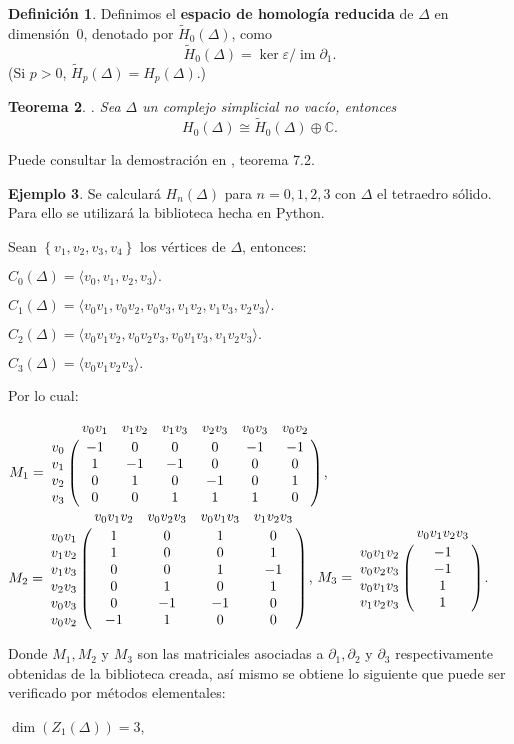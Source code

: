 \documentclass[12pt]{book}
\newtheorem{theorem}{Teorema}[section]
\theoremstyle{definition}
\newtheorem{definition}[theorem]{Definición}
\newtheorem{example}[theorem]{Ejemplo}
\newcounter{in}
\newcounter{ini}
\DeclareMathOperator{\im}{im}
\begin{document}
\begin{definition}
  Definimos el \textbf{espacio de homología reducida} de $\Delta$ en
  dimensión~$0$, denotado por $\widetilde H_{0}(\Delta)$, como
  \begin{equation*}
    \widetilde H_{0}(\Delta)=\ker\varepsilon/ \im \partial_{1}.
  \end{equation*}
  (Si $p>0$, $\widetilde H_{p}(\Delta) = H_{p}(\Delta)$.)
\end{definition}

\begin{theorem}.
  Sea $\Delta$ un complejo simplicial no vacío, entonces
  $$H_{0}(\Delta)\cong \widetilde H_{0}(\Delta)\oplus
  \mathbb{C}.$$
\end{theorem}
Puede consultar la demostración en \cite{munkres1984elements}, teorema 7.2.
\begin{example}
  Se calculará $H_{n}(\Delta)$ para $n=0, 1, 2, 3$ con $\Delta$ el
  tetraedro sólido.  Para ello se utilizará la biblioteca hecha en Python.

  Sean $\left \{ v_1,v_2,v_3,v_4 \right \}$ los vértices de $\Delta$, entonces:
  
  $C_{0}(\Delta)=\langle v_{0},v_{1},v_{2},v_{3}\rangle.$ 
   
  $C_{1}(\Delta)=\langle v_{0}v_{1},v_{0}v_{2},v_{0}v_{3},v_{1}v_{2},v_{1}v_{3},v_{2}v_{3}\rangle.$ 
  
  $C_{2}(\Delta)=\langle v_{0}v_{1}v_{2},v_{0}v_{2}v_{3},v_{0}v_{1}v_{3},v_{1}v_{2}v_{3}\rangle.$  
  
  $C_{3}(\Delta)=\langle v_{0}v_{1}v_{2}v_{3}\rangle.$

  Por lo cual:
  \begin{center}
    $M_1 = \bordermatrix{  & v_{0}v_{1} & v_{1}v_{2} & v_{1}v_{3} & v_{2}v_{3} & v_{0}v_{3} & v_{0}v_{2} \cr
      v_{0} & -1 &  0 &  0 &  0 & -1 & -1 \cr
      v_{1} &  1 & -1 & -1 &  0 &  0 &  0 \cr
      v_{2} &  0 &  1 &  0 & -1 &  0 &  1 \cr
      v_{3} &  0 &  0 &  1 &  1 &  1 &  0 \cr
    }$, \quad
    $M_2 = \bordermatrix{  &  v_{0}v_{1}v_{2} & v_{0}v_{2}v_{3} & v_{0}v_{1}v_{3} & v_{1}v_{2}v_{3} \cr
      v_{0}v_{1}  & 1 &  0 &  1 &  0 \cr
      v_{1}v_{2}  & 1 &  0 &  0 &  1 \cr
      v_{1}v_{3}  & 0 &  0 &  1 & -1 \cr
      v_{2}v_{3}  & 0 &  1 &  0 &  1 \cr
      v_{0}v_{3}  & 0 & -1 & -1 &  0 \cr
      v_{0}v_{2}  & -1&  1 &  0 &  0 \cr
    }$, \quad
     $M_3 = \bordermatrix{  & v_{0}v_{1}v_{2}v_{3} \cr
      v_{0}v_{1}v_{2}  & -1 \cr
      v_{0}v_{2}v_{3}  & -1 \cr
      v_{0}v_{1}v_{3}  &  1 \cr
      v_{1}v_{2}v_{3}  &  1 \cr
    }$.
\end{center}
Donde $M_1, M_2$ y $ M_3$ son las matriciales asociadas a
$\partial_1, \partial_2$ y $\partial_3$ respectivamente obtenidas de
la biblioteca creada, así mismo se obtiene lo siguiente que puede ser
verificado por métodos elementales:
\begin{center}
  $\dim(Z_{1}(\Delta)) = 3$,


\end{center}
\end{example}
\end{document}
